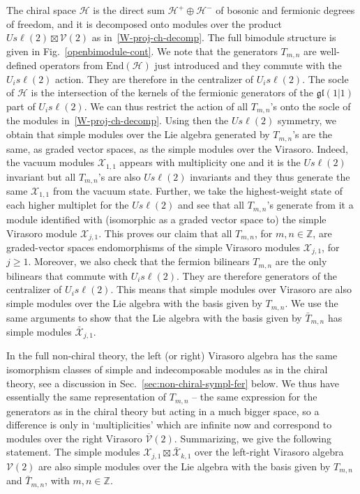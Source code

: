 \documentclass[11pt]{article}
\newcommand{\strt}{T}
\newcommand{\bstrt}{\bar{\strt}}
\newcommand{\LQGi}{U_{i} s\ell(2)}
\newcommand{\Hilb}{\mathcal{H}}
\newcommand{\oZ}{\mathbb{Z}}
\newcommand{\Endo}{\mathrm{End}}
\newcommand{\Vir}{\mathcal{V}}
\newcommand{\VirN}{\boldsymbol{\mathcal{V}}}
\newcommand{\SU}{s\ell}
\newcommand{\gl}{\mathfrak{gl}}
\newcommand{\WP}{\mathcal{H}}
\newcommand{\VX}{\mathcal{X}}
\theoremstyle{definition}
\begin{document}
The chiral space  $\Hilb$  is the direct sum $\WP^{+} \oplus\WP^{-}$ of bosonic and fermionic degrees of freedom, and it is  decomposed
 onto modules over the  product $U \SU(2)\boxtimes\Vir(2)$  as in~\eqref{W-proj-ch-decomp}.  The full bimodule structure is given in Fig.~\ref{openbimodule-cont}.
 We note  that the generators $\strt_{m,n}$ are well-defined operators from $\Endo(\Hilb)$ just introduced  and they commute with the $\LQGi$ action. They are therefore in the centralizer of $\LQGi$. The socle of $\Hilb$ is the intersection of the kernels of the fermionic generators of the $\gl(1|1)$ part of $\LQGi$. We can thus restrict the action of all $\strt_{m,n}$'s onto the socle of the modules in~\eqref{W-proj-ch-decomp}. Using then the $U s\ell(2)$ symmetry, we obtain that simple modules over the Lie algebra generated by $\strt_{m,n}$'s are the same, as graded vector spaces, as the simple modules over the Virasoro. Indeed, the vacuum modules $\VX_{1,1}$ appears with multiplicity one and it is the $U s\ell(2)$ invariant but all $\strt_{m,n}$'s are also $Us\ell(2)$ invariants and they thus generate the same $\VX_{1,1}$ from the vacuum state. Further, we take the highest-weight state of each higher multiplet for the $Us\ell(2)$ and see that all $T_{m,n}$'s generate from it a  module identified with (isomorphic as a graded vector space to) the simple Virasoro module $\VX_{j,1}$. This proves our claim that all $T_{m,n}$, for $m,n\in\oZ$, are graded-vector spaces endomorphisms of the simple Virasoro modules $\VX_{j,1}$, for $j\geq1$.
  Moreover, we also check  that the fermion bilinears $\strt_{m,n}$ are the only bilinears that commute with $\LQGi$.  They are therefore generators of the centralizer of $\LQGi$.
 This means that simple modules over Virasoro are also simple modules over the Lie algebra with the basis given by $\strt_{m,n}$.
 We use the same arguments to show that   the Lie algebra with the basis given by $\bstrt_{m,n}$
 has simple modules $\bar{\VX}_{j,1}$.


In the full non-chiral theory, the left (or right) Virasoro algebra has the same isomorphism classes of simple and indecomposable modules as in the chiral theory, see a discussion in Sec.~\ref{sec:non-chiral-sympl-fer} below.
We thus have essentially the same representation of $\strt_{m,n}$ -- the same expression for the generators as in the chiral theory but acting in a much bigger space, so a difference is only  in `multiplicities' which are infinite now and correspond to modules over the right Virasoro $\overline{\Vir}(2)$. Summarizing,
we give the following statement. The simple modules $\VX_{j,1}\boxtimes\bar{\VX}_{k,1}$ over the left-right Virasoro algebra $\VirN(2)$   are also simple modules over the Lie algebra with the basis given by  $\strt_{m,n}$ and  $\bstrt_{m,n}$, with $m,n\in\oZ$.
\end{document}
